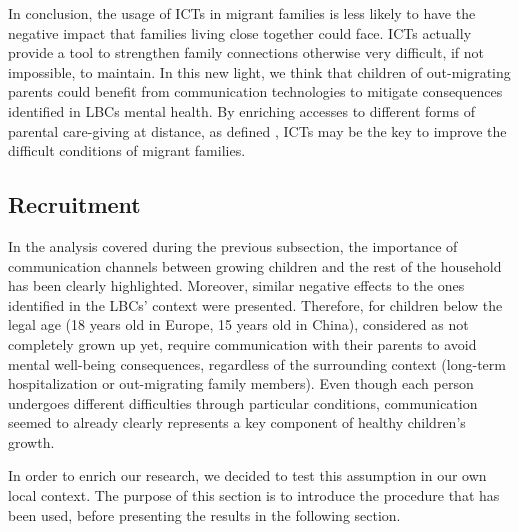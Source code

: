 In conclusion, the usage of ICTs in migrant families is less likely to have the negative impact that families living close together could face. ICTs actually provide a tool to strengthen family connections otherwise very difficult, if not impossible, to maintain. In this new light, we think that children of out-migrating parents could benefit from communication technologies to mitigate consequences identified in LBCs mental health. By enriching accesses to different forms of parental care-giving at distance, as defined \textcite{finch1989family}, ICTs may be the key to improve the difficult conditions of migrant families.

\subsection{Recruitment}
\label{methods-recruitment}
In the analysis covered during the previous subsection, the importance of communication channels between growing children and the rest of the household has been clearly highlighted. Moreover, similar negative effects to the ones identified in the LBCs' context were presented. Therefore, for children below the legal age (18 years old in Europe, 15 years old in China), considered as not completely grown up yet, require communication with their parents to avoid mental well-being consequences, regardless of the surrounding context (long-term hospitalization or out-migrating family members). Even though each person undergoes different difficulties through particular conditions, communication seemed to already clearly represents a key component of healthy children's growth.

In order to enrich our research, we decided to test this assumption in our own local context. The purpose of this section is to introduce the procedure that has been used, before presenting the results in the following section.

